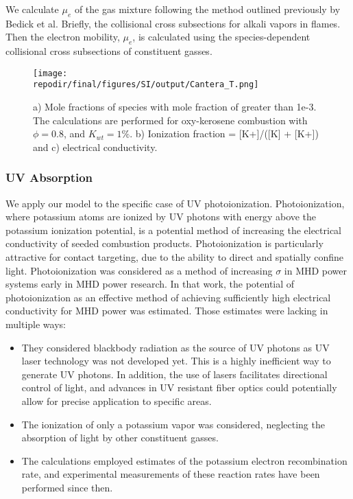 We calculate $\mu_e$ of the gas mixture following the method outlined previously by Bedick et al.\cite{bedickCombustionPlasmaElectrical2017} Briefly, the collisional cross subsections for alkali vapors in flames. Then the electron mobility, \(\mu_{e}\), is calculated using the species-dependent collisional cross subsections of constituent gasses.

\begin{figure}[ht]
    \centering
    \texttt{[image: \\repodir/final/figures/SI/output/Cantera\_T.png]}
    \caption{a) Mole fractions of species with mole fraction of greater than 1e-3. The calculations are performed for oxy-kerosene combustion with \(\phi = 0.8\), and \(K_{wt} = 1\%\). b) Ionization fraction = {[}K+{]}/({[}K{]} + {[}K+{]}) and c) electrical conductivity.}
    \label{fig:SI_Cantera_T}
\end{figure} 


\hypertarget{photoionization}{%
\subsubsection{UV Absorption}\label{photoionization}}



We apply our model to the specific case of UV photoionization. Photoionization, where potassium atoms are ionized by UV photons with energy above the potassium ionization potential, is a potential method of increasing the electrical conductivity of seeded combustion products. Photoionization is particularly attractive for contact targeting, due to the ability to direct and spatially confine light. Photoionization was considered as a method of increasing \(\sigma\) in MHD power systems early in MHD power research.\cite{rosaNonequilibriumIonizationMHD1963} In that work, the potential of photoionization as an effective method of achieving sufficiently high electrical conductivity for MHD power was estimated. Those estimates were lacking in multiple ways:

\begin{itemize}
\item
  They considered blackbody radiation as the source of UV photons as UV laser technology was not developed yet. This is a highly inefficient way to generate UV photons. In addition, the use of lasers facilitates directional control of light, and advances in UV resistant fiber optics could potentially allow for precise application to specific areas.
\item
  The ionization of only a potassium vapor was considered, neglecting the absorption of light by other constituent gasses.
\item
  The calculations employed estimates of the potassium electron recombination rate, and experimental measurements of these reaction rates have been performed since then.
\end{itemize}

